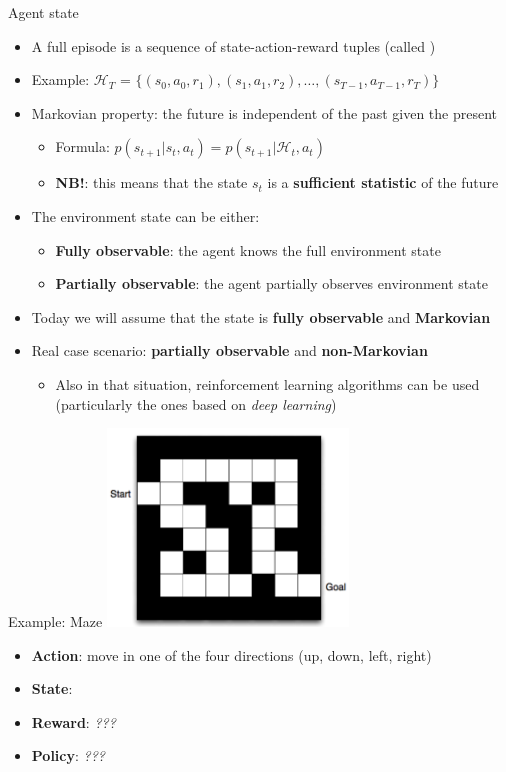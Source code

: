 \documentclass[presentation, 9pt]{beamer}\mode<presentation>{\usetheme{AMSBolognaFC}}
\begin{document}
\begin{frame}{Agent state}
\begin{itemize}
	\item A full episode is a sequence of state-action-reward tuples (called )
	
	\item Example: $\mathcal{H}_T$ = $\{ (s_0, a_0, r_1), (s_1, a_1, r_2), \dots, (s_{T-1}, a_{T-1}, r_T) \}$
	\item Markovian property: the future is independent of the past given the present
	\begin{itemize}
		\item Formula: $p(s_{t+1} | s_t, a_t) = p(s_{t+1} | \mathcal{H}_t, a_t)$
		\item \textbf{NB!}: this means that the state $s_t$ is a \textbf{sufficient statistic} of the future
	\end{itemize}
	\item The environment state can be either:
	\begin{itemize}
		\item \textbf{Fully observable}: the agent knows the full environment state
		\item \textbf{Partially observable}: the agent partially observes environment state 
	\end{itemize}
	\item Today we will assume that the state is \textbf{fully observable} and \textbf{Markovian}
	\item Real case scenario: \textbf{partially observable} and \textbf{non-Markovian}
	\begin{itemize}
		\item Also in that situation, reinforcement learning algorithms can be used (particularly the ones based on \emph{deep learning})
	\end{itemize}
\end{itemize}
\end{frame}
\begin{frame}{Example: Maze}
\centering
\includegraphics[width=0.48\textwidth]{img/maze.png}

\begin{itemize}
	\item \textbf{Action}: move in one of the four directions (up, down, left, right)
	\item \textbf{State}:\only<2>{
		\emph{position in the maze}}
	\item \textbf{Reward}: \emph{???}
	\item \textbf{Policy}: \emph{???}
\end{itemize}
\end{frame}
\end{document}
